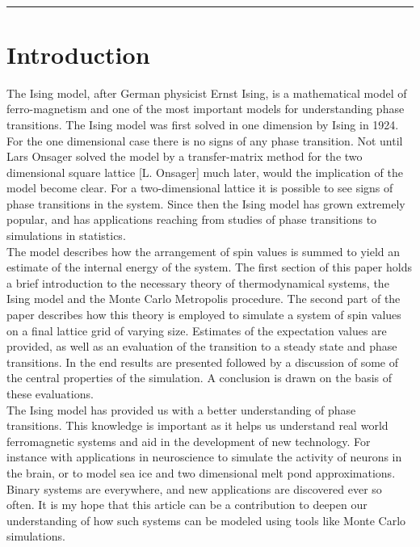 \documentclass[%
reprint,nofootinbib,
amsmath,amssymb,
aps,
]{revtex4-1}
\newcommand{\HRule}{\rule{\textwidth}{0.5mm}}
\begin{document}
\vspace{1.5mm}  \\
\HRule
\vspace{.2cm}


\section{Introduction} \noindent 
\vspace{3mm}
\twocolumngrid
\noindent 
The Ising model, after German physicist Ernst Ising, is a mathematical model of ferro-magnetism and one of the most important models for understanding phase transitions. The Ising model was first solved in one dimension by Ising in 1924. For the one dimensional case there is no signs of any phase transition. Not until Lars Onsager solved the model by a transfer-matrix method for the two dimensional square lattice [L. Onsager] much later, would the implication of the model become clear. For a two-dimensional lattice it is possible to see signs of phase transitions in the system. Since then the Ising model has grown extremely popular, and has applications reaching from studies of phase transitions to simulations in statistics. \\ \indent 
The model describes how the arrangement of spin values is summed to yield an estimate of the internal energy of the system. The first section of this paper holds a brief introduction to the necessary theory of thermodynamical systems, the Ising model and the Monte Carlo Metropolis procedure. The second part of the paper describes how this theory is employed to simulate a system of spin values on a final lattice grid of varying size. Estimates of the expectation values are provided, as well as an evaluation of the transition to a steady state and phase transitions. In the end results are presented followed by a discussion of some of the central properties of the simulation. A conclusion is drawn on the basis of these evaluations. \\ \indent 
The Ising model has provided us with a better understanding of phase transitions. This knowledge is important as it helps us understand real world ferromagnetic systems and aid in the development of new technology. For instance with applications in neuroscience to simulate the activity of neurons in the brain, or to model sea ice and two dimensional melt pond approximations. Binary systems are everywhere, and new applications are discovered ever so often. It is my hope that this article can be a contribution to deepen our understanding of how such systems can be modeled using tools like Monte Carlo simulations.
\end{document}
